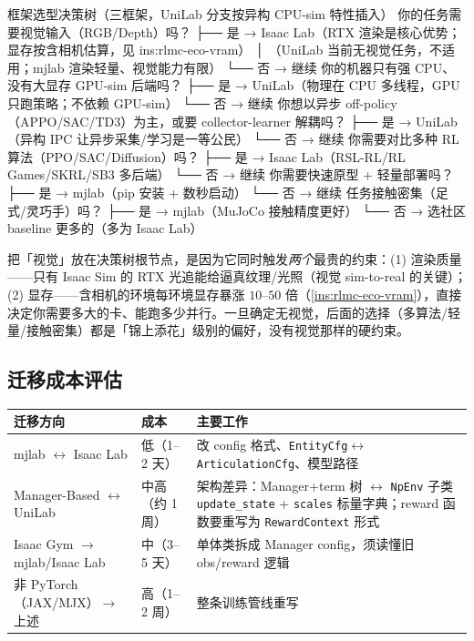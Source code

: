 \begin{codebox}[text]{框架选型决策树（三框架，UniLab 分支按异构 CPU-sim 特性插入）}
你的任务需要视觉输入（RGB/Depth）吗？
  ├── 是 → Isaac Lab（RTX 渲染是核心优势；显存按含相机估算，见 ins:rlmc-eco-vram）
  │        （UniLab 当前无视觉任务，不适用；mjlab 渲染轻量、视觉能力有限）
  └── 否 → 继续
      你的机器只有强 CPU、没有大显存 GPU-sim 后端吗？
        ├── 是 → UniLab（物理在 CPU 多线程，GPU 只跑策略；不依赖 GPU-sim）
        └── 否 → 继续
            你想以异步 off-policy（APPO/SAC/TD3）为主，或要 collector-learner 解耦吗？
              ├── 是 → UniLab（异构 IPC 让异步采集/学习是一等公民）
              └── 否 → 继续
                  你需要对比多种 RL 算法（PPO/SAC/Diffusion）吗？
                    ├── 是 → Isaac Lab（RSL-RL/RL Games/SKRL/SB3 多后端）
                    └── 否 → 继续
                        你需要快速原型 + 轻量部署吗？
                          ├── 是 → mjlab（pip 安装 + 数秒启动）
                          └── 否 → 继续
                              任务接触密集（足式/灵巧手）吗？
                                ├── 是 → mjlab（MuJoCo 接触精度更好）
                                └── 否 → 选社区 baseline 更多的（多为 Isaac Lab）
\end{codebox}

\begin{insight}\label{ins:rlmc-eco-treeroot}
把「视觉」放在决策树根节点，是因为它同时触发\emph{两个}最贵的约束：(1) 渲染质量——只有 Isaac Sim 的 RTX 光追能给逼真纹理/光照（视觉 sim-to-real 的关键）；(2) 显存——含相机的环境每环境显存暴涨 $10$--$50$ 倍（\cref{ins:rlmc-eco-vram}），直接决定你需要多大的卡、能跑多少并行。一旦确定无视觉，后面的选择（多算法/轻量/接触密集）都是「锦上添花」级别的偏好，没有视觉那样的硬约束。
\end{insight}

\subsection{迁移成本评估}

\begin{center}
\small
\begin{tabular}{@{}lll@{}}
\toprule
迁移方向 & 成本 & 主要工作 \\
\midrule
mjlab $\leftrightarrow$ Isaac Lab & 低（1--2 天） & 改 config 格式、\verb|EntityCfg|$\leftrightarrow$\verb|ArticulationCfg|、模型路径 \\
Manager-Based $\leftrightarrow$ UniLab & 中高（约 1 周） & 架构差异：Manager+term 树 $\leftrightarrow$ \verb|NpEnv| 子类 \verb|update_state| + \verb|scales| 标量字典；reward 函数要重写为 \verb|RewardContext| 形式 \\
Isaac Gym $\to$ mjlab/Isaac Lab & 中（3--5 天） & 单体类拆成 Manager config，须读懂旧 obs/reward 逻辑 \\
非 PyTorch（JAX/MJX）$\to$ 上述 & 高（1--2 周） & 整条训练管线重写 \\
\bottomrule
\end{tabular}
\end{center}

